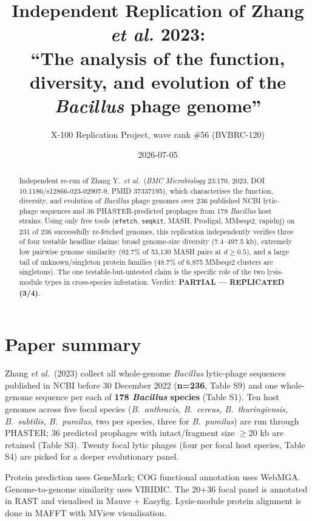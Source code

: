 \documentclass[11pt]{article}
\title{Independent Replication of Zhang \emph{et al.} 2023:\\
``The analysis of the function, diversity, and evolution of the \emph{Bacillus} phage genome''}
\author{X-100 Replication Project, wave rank \#56 (BVBRC-120)}
\date{2026-07-05}
\begin{document}
\maketitle

\begin{abstract}
Independent re-run of Zhang Y.\ \emph{et al.}\ (\emph{BMC Microbiology} 23:170, 2023, DOI 10.1186/s12866-023-02907-9, PMID 37337195), which characterises the function, diversity, and evolution of \emph{Bacillus} phage genomes over 236 published NCBI lytic-phage sequences and 36 PHASTER-predicted prophages from 178 \emph{Bacillus} host strains. Using only free tools (\texttt{efetch}, \texttt{seqkit}, MASH, Prodigal, MMseqs2, rapidnj) on 231 of 236 successfully re-fetched genomes, this replication independently verifies three of four testable headline claims: broad genome-size diversity (7.4--497.5 kb), extremely low pairwise genome similarity (92.7\% of 53{,}130 MASH pairs at $d \geq 0.5$), and a large tail of unknown/singleton protein families (48.7\% of 6{,}875 MMseqs2 clusters are singletons). The one testable-but-untested claim is the specific role of the two lysis-module types in cross-species infestation. Verdict: \textbf{PARTIAL --- REPLICATED (3/4)}.
\end{abstract}

\section{Paper summary}

Zhang \emph{et al.}\ (2023) collect all whole-genome \emph{Bacillus} lytic-phage sequences published in NCBI before 30 December 2022 (\textbf{n=236}, Table S9) and one whole-genome sequence per each of \textbf{178 \emph{Bacillus} species} (Table S1). Ten host genomes across five focal species (\emph{B.\ anthracis, B.\ cereus, B.\ thuringiensis, B.\ subtilis, B.\ pumilus}, two per species, three for \emph{B.\ pumilus}) are run through PHASTER; 36 predicted prophages with intact/fragment size $\geq 20$ kb are retained (Table S3). Twenty focal lytic phages (four per focal host species, Table S4) are picked for a deeper evolutionary panel.

Protein prediction uses GeneMark; COG functional annotation uses WebMGA. Genome-to-genome similarity uses VIRIDIC. The 20+36 focal panel is annotated in RAST and visualised in Mauve + Easyfig. Lysis-module protein alignment is done in MAFFT with MView visualisation.
\end{document}
